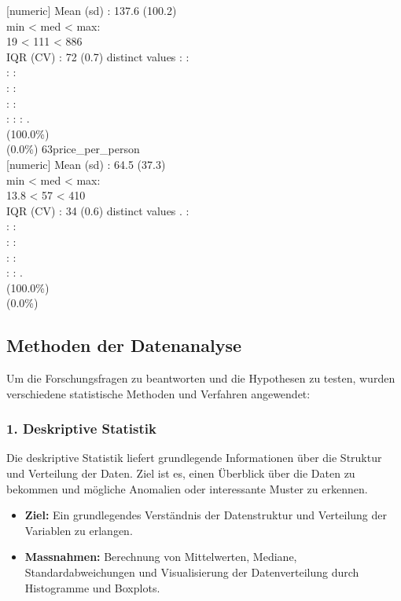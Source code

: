 \documentclass[
  journal,
]{IEEEtran}%
\begin{document}
{[}numeric{]} \textbar Mean (sd) : 137.6 (100.2)\\
min \textless{} med \textless{} max:\\
19 \textless{} 111 \textless{} 886\\
IQR (CV) : 72 (0.7)  distinct values \textbar{} \textbar: :\\
: :\\
: :\\
: :\\
: : : . \\
(100.0\%) \\
(0.0\%) \textbar{} \textbar{} 63\textbar price\_per\_person\\
{[}numeric{]} \textbar Mean (sd) : 64.5 (37.3)\\
min \textless{} med \textless{} max:\\
13.8 \textless{} 57 \textless{} 410\\
IQR (CV) : 34 (0.6)  distinct values \textbar{} \textbar. :\\
: :\\
: :\\
: :\\
: : . \\
(100.0\%) \\
(0.0\%) \textbar{}

\subsection{Methoden der Datenanalyse}\label{methoden-der-datenanalyse}

Um die Forschungsfragen zu beantworten und die Hypothesen zu testen,
wurden verschiedene statistische Methoden und Verfahren angewendet:

\subsubsection{\texorpdfstring{1. \textbf{Deskriptive
Statistik}}{1. Deskriptive Statistik}}\label{deskriptive-statistik}

Die deskriptive Statistik liefert grundlegende Informationen über die
Struktur und Verteilung der Daten. Ziel ist es, einen Überblick über die
Daten zu bekommen und mögliche Anomalien oder interessante Muster zu
erkennen.

\begin{itemize}
\item
  \textbf{Ziel:} Ein grundlegendes Verständnis der Datenstruktur und
  Verteilung der Variablen zu erlangen.
\item
  \textbf{Massnahmen:} Berechnung von Mittelwerten, Mediane,
  Standardabweichungen und Visualisierung der Datenverteilung durch
  Histogramme und Boxplots.
\end{itemize}
\end{document}
